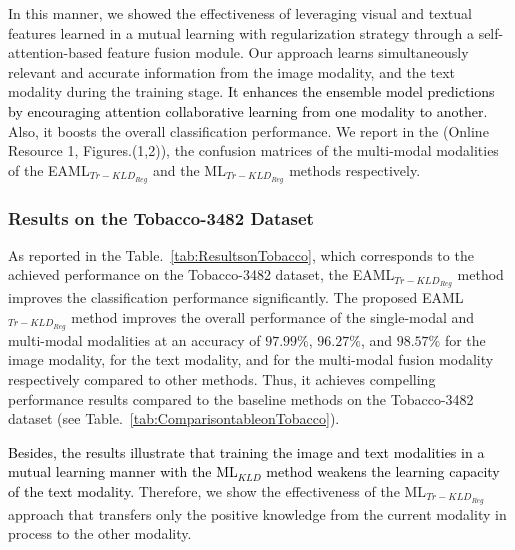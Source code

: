 \documentclass[twocolumn]{svjour3}
\begin{document}
In this manner, we showed the effectiveness of leveraging visual and textual features learned in a mutual learning with regularization strategy through a self-attention-based feature fusion module. Our approach learns simultaneously relevant and accurate information from the image modality, and the text modality during the training stage. \textcolor{black}{It enhances the ensemble model predictions by encouraging attention collaborative learning from one modality to another}. Also, it boosts the overall classification performance.
We report in the (Online Resource 1, Figures.(1,2)), the confusion matrices of the multi-modal modalities of the EAML$_{{Tr-KLD}_{Reg}}$ and the ML$_{{Tr-KLD}_{Reg}}$ methods respectively.

\subsubsection{Results on the Tobacco-3482 Dataset}

As reported in the Table.~\ref{tab:ResultsonTobacco}, which corresponds to the achieved performance on the Tobacco-3482 dataset, the EAML$_{{Tr-KLD}_{Reg}}$ method improves the classification performance significantly. 
The proposed EAML$_{{Tr-KLD}_{Reg}}$ method improves the overall performance of the single-modal and multi-modal modalities at an accuracy of $97.99\%$, $96.27\%$, and $98.57\%$ for the image modality, for the text modality, and for the multi-modal fusion modality respectively compared to other methods. Thus, it achieves compelling performance results compared to the baseline methods on the Tobacco-3482 dataset (see Table.~\ref{tab:ComparisontableonTobacco}).

\textcolor{black}{Besides, the results illustrate that training the image and text modalities in a mutual learning manner with the ML$_{KLD}$ method weakens the learning capacity of the text modality}. Therefore, we show the effectiveness of the ML$_{{Tr-KLD}_{Reg}}$ approach that transfers only the positive knowledge from the current modality in process to the other modality.
\end{document}
